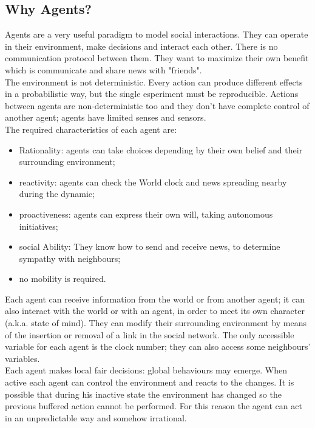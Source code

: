 \subsection{Why Agents?}
Agents are a very useful paradigm to model social interactions. 
They can operate in their environment, make decisions and interact each other.
There is no communication protocol between them. They want to maximize their own benefit which is
communicate and share news with "friends". \\
The environment is not deterministic. 
Every action can produce different effects in a probabilistic way, but the single esperiment must be reproducible.
Actions between agents are non-deterministic too and they don't have complete control of another
agent; agents have limited senses and sensors.
\\
The required characteristics of each agent are: \begin{itemize}
\item Rationality: agents can take choices depending by their own belief and their surrounding environment;
\item reactivity: agents can check the World clock and news spreading nearby during the dynamic;
\item proactiveness: agents can express their own will, taking autonomous initiatives;
\item social Ability: They know how to send and receive news, to determine sympathy with neighbours;
\item no mobility is required. 
\end{itemize}

Each agent can receive information from the world or from another agent; it can also interact with 
the world or with an agent, in order to meet its own character (a.k.a. state of mind).
They can modify their surrounding environment by means of the insertion or removal of a link in the social network.
The only accessible variable for each agent is the clock number; they can also access some neighbours' variables.
\\
Each agent makes local fair decisions: global behaviours may emerge.
When active each agent can control the environment and reacts to the changes. 
It is possible that during his inactive state the environment has changed so the previous buffered action cannot be performed.
For this reason the agent can act in an unpredictable way and somehow irrational.

